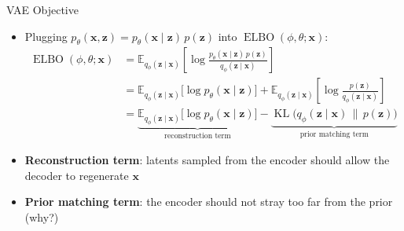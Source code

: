 \documentclass[11pt,compress,t,notes=noshow, xcolor=table]{beamer}
\providecommand{\bx}{\mathbf{x}}
\providecommand{\bz}{\mathbf{z}}
\begin{document}
\begin{frame}{VAE Objective}

\vfill

\begin{itemize}
\item Plugging $p_\theta(\bx, \bz) = p_\theta(\bx \mid \bz)\, p(\bz)$ into $\operatorname{ELBO}(\phi, \theta; \bx)$:
\begin{align*}
\operatorname{ELBO}(\phi, \theta; \bx) &= \mathbb{E}_{q_\phi(\bz \mid \bx)}\left[\log \frac{p_\theta(\bx \mid \bz)\, p(\bz)}{q_\phi(\bz \mid \bx)}\right]\\
&= \mathbb{E}_{q_\phi(\bz \mid \bx)}\big[\log p_\theta(\bx \mid \bz)\big] + \mathbb{E}_{q_\phi(\bz \mid \bx)}\left[\log \frac{p(\bz)}{q_\phi(\bz \mid \bx)}\right]\\
&= \underbrace{\mathbb{E}_{q_\phi(\bz \mid \bx)}\big[\log p_\theta(\bx \mid \bz)\big]}_{\text{reconstruction term}} - \underbrace{\operatorname{KL}\big(q_\phi(\bz \mid \bx) \,\|\, p(\bz)\big)}_{\text{prior matching term}}
\end{align*}
\item \textbf{Reconstruction term}: latents sampled from the encoder should allow the decoder to regenerate $\bx$
\item \textbf{Prior matching term}: the encoder should not stray too far from the prior (why?)
\end{itemize}

\vfill

\end{frame}
\end{document}
